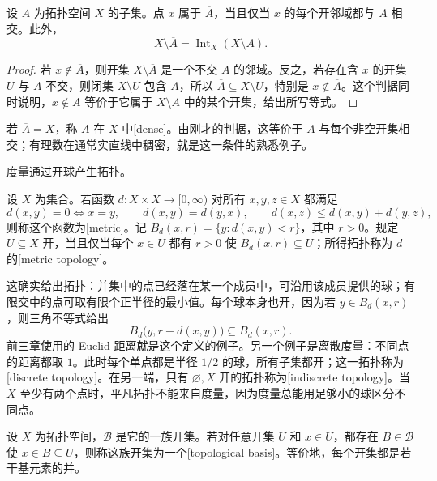 \begin{proposition}\label{g1:prop:closure-neighborhood}
	设 \(A\) 为拓扑空间 \(X\) 的子集。点 \(x\) 属于 \(\overline A\)，当且仅当 \(x\) 的每个开邻域都与 \(A\) 相交。此外，
	\[
		X\setminus\overline A=\operatorname{Int}_X(X\setminus A).
	\]
\end{proposition}
\begin{proof}
	若 \(x\notin\overline A\)，则开集 \(X\setminus\overline A\) 是一个不交 \(A\) 的邻域。反之，若存在含 \(x\) 的开集 \(U\) 与 \(A\) 不交，则闭集 \(X\setminus U\) 包含 \(A\)，所以 \(\overline A\subseteq X\setminus U\)，特别是 \(x\notin\overline A\)。这个判据同时说明，\(x\notin\overline A\) 等价于它属于 \(X\setminus A\) 中的某个开集，给出所写等式。
\end{proof}

若 \(\overline A=X\)，称 \(A\) 在 \(X\) 中[dense]。由刚才的判据，这等价于 \(A\) 与每个非空开集相交；有理数在通常实直线中稠密，就是这一条件的熟悉例子。

度量通过开球产生拓扑。

\begin{definition}[度量及其拓扑]\label{g1:def:metric-topology}
	设 \(X\) 为集合。若函数 \(d:X\times X\to[0,\infty)\) 对所有 \(x,y,z\in X\) 都满足
	\[
		d(x,y)=0\Longleftrightarrow x=y,\qquad d(x,y)=d(y,x),\qquad d(x,z)\le d(x,y)+d(y,z),
	\]
	则称这个函数为[metric]。记 \(B_d(x,r)=\{y:d(x,y)<r\}\)，其中 \(r>0\)。规定 \(U\subseteq X\) 开，当且仅当每个 \(x\in U\) 都有 \(r>0\) 使 \(B_d(x,r)\subseteq U\)；所得拓扑称为 \(d\) 的[metric topology]。
\end{definition}

这确实给出拓扑：并集中的点已经落在某一个成员中，可沿用该成员提供的球；有限交中的点可取有限个正半径的最小值。每个球本身也开，因为若 \(y\in B_d(x,r)\)，则三角不等式给出
\[
	B_d\bigl(y,r-d(x,y)\bigr)\subseteq B_d(x,r).
\]
前三章使用的 Euclid 距离就是这个定义的例子。另一个例子是离散度量：不同点的距离都取 \(1\)。此时每个单点都是半径 \(1/2\) 的球，所有子集都开；这一拓扑称为[discrete topology]。在另一端，只有 \(\varnothing,X\) 开的拓扑称为[indiscrete topology]。当 \(X\) 至少有两个点时，平凡拓扑不能来自度量，因为度量总能用足够小的球区分不同点。

\begin{definition}\label{g1:def:topological-basis}
	设 \(X\) 为拓扑空间，\(\mathcal B\) 是它的一族开集。若对任意开集 \(U\) 和 \(x\in U\)，都存在 \(B\in\mathcal B\) 使 \(x\in B\subseteq U\)，则称这族开集为一个[topological basis]。等价地，每个开集都是若干基元素的并。
\end{definition}

